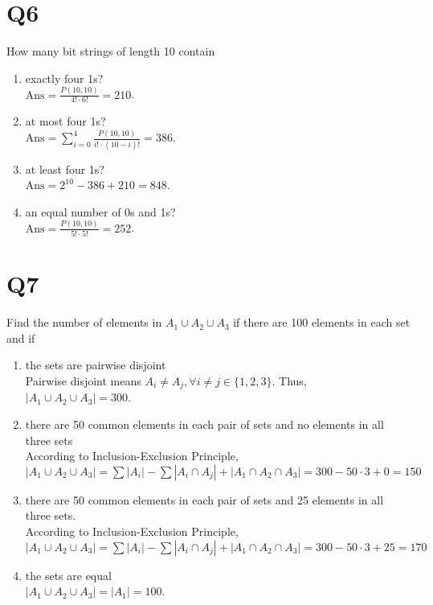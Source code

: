 \documentclass[11pt]{article}
\newenvironment{qparts}{\begin{enumerate}[{(}a{)}]}{\end{enumerate}}
\begin{document}
\section*{Q6}
How many bit strings of length 10 contain
\begin{qparts}
    
    \item exactly four 1s?\\
    $\text{Ans}=\frac{P(10, 10)}{4!\cdot 6!}=210$.

    \item at most four 1s?\\
    $\text{Ans}=\sum_{i=0}^4 \frac{P(10 , 10)}{i! \cdot (10-i)!}=386$.

    \item at least four 1s?\\
    $\text{Ans}=2^{10}-386+210=848$.

    \item an equal number of 0s and 1s?\\
    $\text{Ans}=\frac{P(10, 10)}{5!\cdot 5!}=252$.
\end{qparts}

\section*{Q7}
Find the number of elements in $A_1 \cup  A_2 \cup  A_3$ if there are 100
elements in each set and if
\begin{qparts}
    
    \item the sets are pairwise disjoint\\
    Pairwise disjoint means $A_i\neq A_j, \forall i\neq j \in \{ 1,2,3 \}$. Thus, $\left\vert A_1 \cup A_2 \cup A_3 \right\vert =300$.

    \item there are 50 common elements in each pair of sets and no elements in all three sets\\
    According to Inclusion-Exclusion Principle, \\$
    \left\vert A_1 \cup A_2 \cup A_3 \right\vert=
    \sum\left\vert A_{i } \right\vert-\sum\left\vert A_{i} \cap A_{j } \right\vert+\left\vert A_1 \cap A_2 \cap A_3 \right\vert=300-50\cdot 3+0=150$

    \item there are 50 common elements in each pair of sets and 25 elements in all three sets.\\
    According to Inclusion-Exclusion Principle, \\$
    \left\vert A_1 \cup A_2 \cup A_3 \right\vert=
    \sum\left\vert A_{i } \right\vert-\sum\left\vert A_{i} \cap A_{j } \right\vert+\left\vert A_1 \cap A_2 \cap A_3 \right\vert=300-50\cdot 3+25=170$

    \item the sets are equal\\
    $\left\vert A_1 \cup A_2 \cup A_3 \right\vert=\left\vert A_1 \right\vert=100  $.
\end{qparts}
\end{document}
